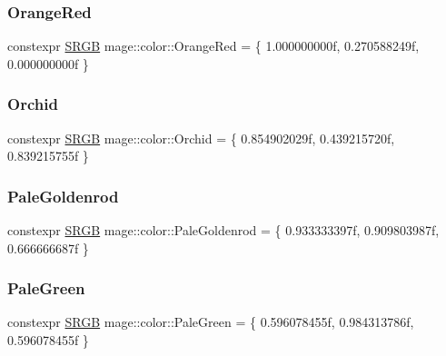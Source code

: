 \hypertarget{namespacemage_1_1color_a45f7b1033b0d4f2eda6a0b2e9bbdc203}{}\label{namespacemage_1_1color_a45f7b1033b0d4f2eda6a0b2e9bbdc203} 
\subsubsection{\texorpdfstring{Orange\+Red}{OrangeRed}}
{\footnotesize\ttfamily constexpr \hyperlink{structmage_1_1_s_r_g_b}{S\+R\+GB} mage\+::color\+::\+Orange\+Red = \{ 1.\+000000000f, 0.\+270588249f, 0.\+000000000f \}}

\hypertarget{namespacemage_1_1color_af52662e157e6674b473007146e3c40f6}{}\label{namespacemage_1_1color_af52662e157e6674b473007146e3c40f6} 
\subsubsection{\texorpdfstring{Orchid}{Orchid}}
{\footnotesize\ttfamily constexpr \hyperlink{structmage_1_1_s_r_g_b}{S\+R\+GB} mage\+::color\+::\+Orchid = \{ 0.\+854902029f, 0.\+439215720f, 0.\+839215755f \}}

\hypertarget{namespacemage_1_1color_a493db5a4fbb51a82bd265f376c6a5e7e}{}\label{namespacemage_1_1color_a493db5a4fbb51a82bd265f376c6a5e7e} 
\subsubsection{\texorpdfstring{Pale\+Goldenrod}{PaleGoldenrod}}
{\footnotesize\ttfamily constexpr \hyperlink{structmage_1_1_s_r_g_b}{S\+R\+GB} mage\+::color\+::\+Pale\+Goldenrod = \{ 0.\+933333397f, 0.\+909803987f, 0.\+666666687f \}}

\hypertarget{namespacemage_1_1color_a14c756d3d980a36599956a1f8f208dd3}{}\label{namespacemage_1_1color_a14c756d3d980a36599956a1f8f208dd3} 
\subsubsection{\texorpdfstring{Pale\+Green}{PaleGreen}}
{\footnotesize\ttfamily constexpr \hyperlink{structmage_1_1_s_r_g_b}{S\+R\+GB} mage\+::color\+::\+Pale\+Green = \{ 0.\+596078455f, 0.\+984313786f, 0.\+596078455f \}}

